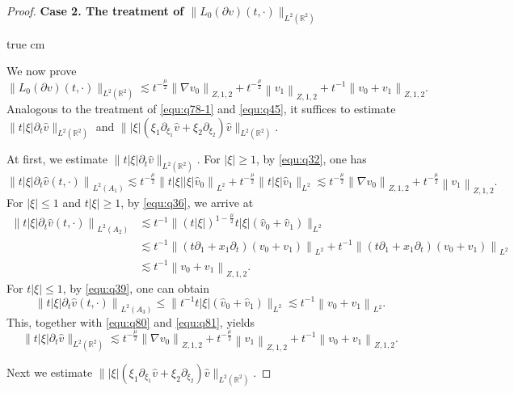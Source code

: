 \documentclass[11pt,twoside]{article}
\newcommand{\R}{\mathbb R}
\newcommand{\p}{\partial}
\newcommand{\f}{\frac}
\theoremstyle{plain}
\theoremstyle{definition}
\theoremstyle{remark}
\numberwithin{equation}{section}
\begin{document}
\begin{proof}
{\bf Case 2.  The treatment of $\|L_0(\p v)(t, \cdot)\|_{L^2(\R^2)}$}

 true cm

We now prove
\begin{equation}\label{equ:q79}
\|L_0(\p v)(t, \cdot)\|_{L^2(\R^2)} \lesssim t^{-\f{\mu}{2}}\left\|\nabla v_0\right\|_{Z, 1, 2}
+t^{-\f{\mu}{2}}\left\|v_1\right\|_{Z, 1,2}+t^{-1}\left\|v_0+v_1\right\|_{Z, 1, 2}.
\end{equation}
Analogous to the treatment of \eqref{equ:q78-1} and \eqref{equ:q45}, it suffices to estimate  $\|t|\xi|\p_t\hat{v}\|_{L^2(\R^2)}$ and $\||\xi|(\xi_1\p_{\xi_1}\hat{v}+\xi_2\p_{\xi_2})\hat{v}\|_{L^2(\R^2)}$.

At first, we estimate $\|t|\xi|\p_t\hat{v}\|_{L^2(\R^2)}$. For $|\xi|\geq1$,  by \eqref{equ:q32}, one has
\begin{equation}\label{equ:q80}
\left\|t|\xi|\p_t\hat{v}(t, \cdot)\right\|_{L^2(A_1)}
 \lesssim t^{-\frac{\mu}{2}}\left\|t|\xi||\xi|\hat{v}_{0}\right\|_{L^{2}}+t^{-\f{\mu}{2}} \|t|\xi|\hat{v}_{1}\|_{L^{2}} \lesssim t^{-\f{\mu}{2}}\left\|\nabla v_0\right\|_{Z,1,2}+t^{-\f{\mu}{2}}\left\|v_1\right\|_{Z,1,2}.
\end{equation}
For $|\xi|\leq1$ and $t|\xi|\geq1$,  by  \eqref{equ:q36}, we arrive at
\begin{equation}\label{equ:q81}
\begin{aligned}
\left\|t|\xi|\p_t\hat{v}(t, \cdot)\right\|_{L^2(A_2)}
&\lesssim t^{-1}\big\|(t|\xi|)^{1-\f{\mu}{2}}t|\xi|(\hat{v}_{0}+\hat{v}_{1})\big\|_{L^2}\\
& \lesssim  t^{-1}\left\|(t\p_1+x_1\p_t)(v_{0}+v_1)\right\|_{L^{2}}+ t^{-1}\left\|(t\p_1+x_1\p_t)(v_0+v_{1})\right\|_{L^2}\\
&\lesssim t^{-1}\left\|v_{0}+v_{1}\right\|_{Z, 1, 2}.
\end{aligned}
\end{equation}
For  $t|\xi|\leq1$,  by  \eqref{equ:q39}, one can obtain
$$
\left\|t|\xi|\p_t\hat{v}(t, \cdot)\right\|_{L^2(A_3)}  \leq\big\|t^{-1}t|\xi|(\hat{v}_{0}+\hat{v}_{1})\big\|_{L^{2}}
\lesssim t^{-1}\left\|v_{0}+v_{1}\right\|_{L^ 2}.
$$
This, together with \eqref{equ:q80} and \eqref{equ:q81}, yields
\begin{equation}\label{equ:q82}
\|t|\xi|\p_t\hat{v}\|_{L^2(\R^2)}\lesssim t^{-\f{\mu}{2}}\left\|\nabla v_0\right\|_{Z, 1, 2}
+t^{-\f{\mu}{2}}\left\|v_1\right\|_{Z, 1,2}+t^{-1}\left\|v_0+v_1\right\|_{Z, 1, 2}.
\end{equation}


Next we estimate  $\||\xi|(\xi_1\p_{\xi_1}\hat{v}+\xi_2\p_{\xi_2})\hat{v}\|_{L^2(\R^2)}$.


\end{proof}
\end{document}
